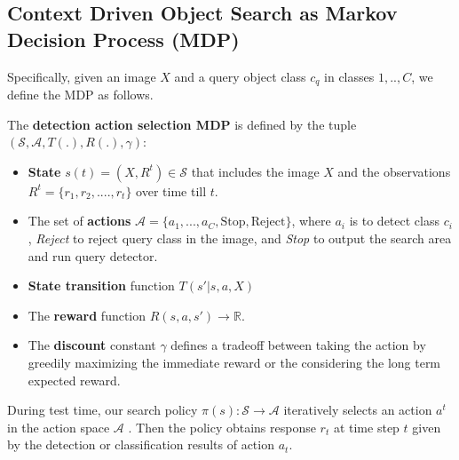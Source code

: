 \subsection{Context Driven Object Search as Markov Decision Process (MDP)}
\label{sec:policy}

Specifically, given an image $X$ and a query object class $c_q$ in classes ${1,..,C}$, we define the MDP as follows.
\begin{mydef}
 The \textbf{detection action selection MDP} is defined by the tuple $(\mathcal{S}, \mathcal{A}, T(.), R(.), \gamma)$:
\begin{itemize}
\item \textbf{State} $s(t) = (X, R^t)\in \mathcal{S}$ that includes the image $X$ and the observations $R^t= \{r_1, r_2, ....,r_t\}$ over time till $t$.
\item The set of \textbf{actions} $\mathcal{A} = \{a_1, ..., a_C, \mbox{Stop}, \mbox{Reject}\} $, where $a_i$ is to detect class $c_i$, \textit{Reject} to reject query class in the image, and \textit{Stop} to output the search area and run query detector.
\item \textbf{State transition} function $T(s'|s,a, X)$ 
\item The \textbf{reward} function $R(s,a,s') \rightarrow \mathbb{R}$. 
\item The \textbf{discount} constant $\gamma$ defines a tradeoff between taking the action by greedily maximizing the immediate reward or the considering the long term expected reward.
\end{itemize}
\end{mydef}

% 


During test time, our search policy $\pi(s): \mathcal{S} \rightarrow \mathcal{A}$ iteratively selects an action $a^t$ in the action space $\mathcal{A}$ . %
Then the policy obtains response $r_t$ at time step $t$ given by the detection or classification results of action $a_t$. 

